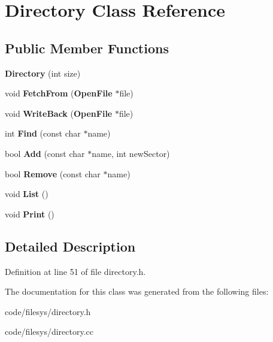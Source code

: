 \section{Directory Class Reference}
\label{class_directory}
\subsection*{Public Member Functions}
\begin{DoxyCompactItemize}
\item 
{\bfseries Directory} (int size)\label{class_directory_a77366fc5c4d73a3c20fc060640b1258a}

\item 
void {\bfseries Fetch\+From} ({\bf Open\+File} $\ast$file)\label{class_directory_a36ed455b21bbd9a66ffe8ec689ff7c73}

\item 
void {\bfseries Write\+Back} ({\bf Open\+File} $\ast$file)\label{class_directory_abf5550df42587bbc604c71441a4d12fc}

\item 
int {\bfseries Find} (const char $\ast$name)\label{class_directory_abfe376d1883918703cda2a6a4e23ffa8}

\item 
bool {\bfseries Add} (const char $\ast$name, int new\+Sector)\label{class_directory_aab3700537a499e57a07c79ba666d2fcb}

\item 
bool {\bfseries Remove} (const char $\ast$name)\label{class_directory_a3ad4280cbe376ef803105e6a35856165}

\item 
void {\bfseries List} ()\label{class_directory_a5065793fb216a407cc3871dd3c837117}

\item 
void {\bfseries Print} ()\label{class_directory_a40c728221c5557e4fc181c4091c6fcff}

\end{DoxyCompactItemize}


\subsection{Detailed Description}


Definition at line 51 of file directory.\+h.



The documentation for this class was generated from the following files\+:\begin{DoxyCompactItemize}
\item 
code/filesys/directory.\+h\item 
code/filesys/directory.\+cc\end{DoxyCompactItemize}

